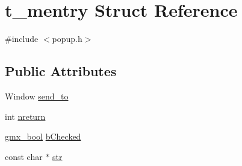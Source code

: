 \hypertarget{structt__mentry}{\section{t\-\_\-mentry \-Struct \-Reference}
\label{structt__mentry}
}


{\ttfamily \#include $<$popup.\-h$>$}

\subsection*{\-Public \-Attributes}
\begin{DoxyCompactItemize}
\item 
\-Window \hyperlink{structt__mentry_a658ff5ee36ab0b7fe0182c437c7a8ae3}{send\-\_\-to}
\item 
int \hyperlink{structt__mentry_a6269117915f259f39466f61b69e2d93f}{nreturn}
\item 
\hyperlink{include_2types_2simple_8h_a8fddad319f226e856400d190198d5151}{gmx\-\_\-bool} \hyperlink{structt__mentry_a1c0a7cb00ce40aa6778b830a807a08d1}{b\-Checked}
\item 
const char $\ast$ \hyperlink{structt__mentry_ae41ed23d573834aa0cbc4abb129135bd}{str}
\end{DoxyCompactItemize}


